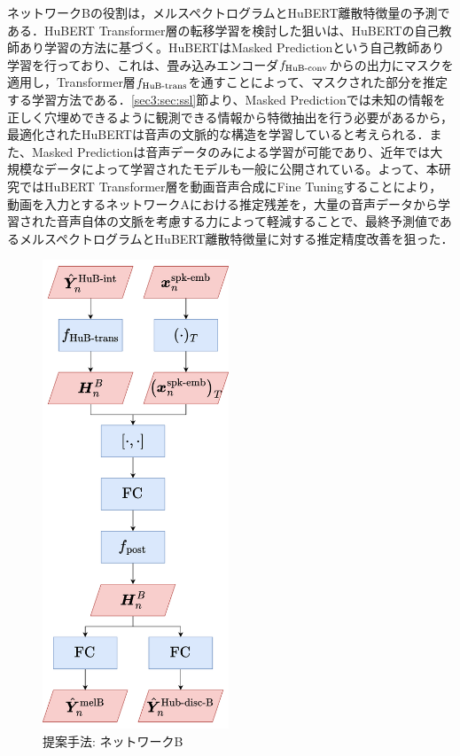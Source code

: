ネットワークBの役割は，メルスペクトログラムとHuBERT離散特徴量の予測である．HuBERT Transformer層の転移学習を検討した狙いは、HuBERTの自己教師あり学習の方法に基づく。HuBERTはMasked Predictionという自己教師あり学習を行っており、これは、畳み込みエンコーダ$f_{\text{HuB-conv}}$からの出力にマスクを適用し，Transformer層$f_{\text{HuB-trans}}$を通すことによって、マスクされた部分を推定する学習方法である．\ref{sec3:sec:ssl}節より、Masked Predictionでは未知の情報を正しく穴埋めできるように観測できる情報から特徴抽出を行う必要があるから，最適化されたHuBERTは音声の文脈的な構造を学習していると考えられる．また、Masked Predictionは音声データのみによる学習が可能であり、近年では大規模なデータによって学習されたモデルも一般に公開されている。よって、本研究ではHuBERT Transformer層を動画音声合成にFine Tuningすることにより，動画を入力とするネットワークAにおける推定残差を，大量の音声データから学習された音声自体の文脈を考慮する力によって軽減することで、最終予測値であるメルスペクトログラムとHuBERT離散特徴量に対する推定精度改善を狙った．

\begin{figure}[bt]
    \centering
    \includegraphics[height=140mm]{./figure/sec4/model_2/networkB.drawio.png}
    \caption{提案手法: ネットワークB}
    \label{sec4:fig:networkB}
\end{figure}

